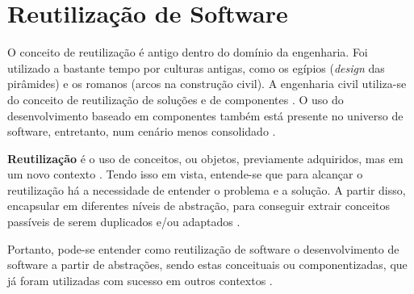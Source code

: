 \section{Reutilização de Software}
O conceito de reutilização é antigo dentro do domínio da engenharia. Foi utilizado a bastante tempo por culturas antigas, como os egípios (\textit{design} das pirâmides) e os romanos (arcos na construção civil). A engenharia civil utiliza-se do conceito de reutilização de soluções e de componentes \cite{sutcliffe2002}. O uso do desenvolvimento baseado em componentes também está presente no universo de software, entretanto, num cenário menos consolidado \cite{sutcliffe2002}.
\par
\indent \textbf{Reutilização} é o uso de conceitos, ou objetos, previamente adquiridos, mas em um novo contexto \cite{sutcliffe2002}. Tendo isso em vista, entende-se que para alcançar o reutilização há a necessidade de entender o problema e a solução. A partir disso, encapsular em diferentes níveis de abstração, para conseguir extrair conceitos passíveis de serem duplicados e/ou adaptados \cite{sutcliffe2002}.
\par
\indent Portanto, pode-se entender como reutilização de software o desenvolvimento de software a partir de abstrações, sendo estas conceituais ou componentizadas, que já foram utilizadas com sucesso em outros contextos \cite{sutcliffe2002}.

